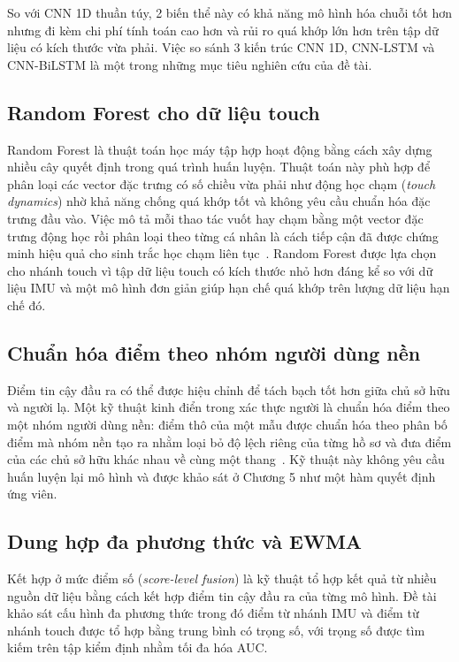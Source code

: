 \documentclass[../DoAn.tex]{subfiles}
\begin{document}
So với CNN 1D thuần túy, 2 biến thể này có khả năng mô hình hóa chuỗi tốt hơn nhưng đi kèm chi phí tính toán cao hơn và rủi ro quá khớp lớn hơn trên tập dữ liệu có kích thước vừa phải. Việc so sánh 3 kiến trúc CNN 1D, CNN-LSTM và CNN-BiLSTM là một trong những mục tiêu nghiên cứu của đề tài.

\subsection{Random Forest cho dữ liệu touch}

Random Forest là thuật toán học máy tập hợp hoạt động bằng cách xây dựng nhiều cây quyết định trong quá trình huấn luyện. Thuật toán này phù hợp để phân loại các vector đặc trưng có số chiều vừa phải như động học chạm (\textit{touch dynamics}) nhờ khả năng chống quá khớp tốt và không yêu cầu chuẩn hóa đặc trưng đầu vào. Việc mô tả mỗi thao tác vuốt hay chạm bằng một vector đặc trưng động học rồi phân loại theo từng cá nhân là cách tiếp cận đã được chứng minh hiệu quả cho sinh trắc học chạm liên tục~\cite{frank2013touchalytics}. Random Forest được lựa chọn cho nhánh touch vì tập dữ liệu touch có kích thước nhỏ hơn đáng kể so với dữ liệu IMU và một mô hình đơn giản giúp hạn chế quá khớp trên lượng dữ liệu hạn chế đó.

\subsection{Chuẩn hóa điểm theo nhóm người dùng nền}

Điểm tin cậy đầu ra có thể được hiệu chỉnh để tách bạch tốt hơn giữa chủ sở hữu và người lạ. Một kỹ thuật kinh điển trong xác thực người là chuẩn hóa điểm theo một nhóm người dùng nền: điểm thô của một mẫu được chuẩn hóa theo phân bố điểm mà nhóm nền tạo ra nhằm loại bỏ độ lệch riêng của từng hồ sơ và đưa điểm của các chủ sở hữu khác nhau về cùng một thang~\cite{auckenthaler2000score}. Kỹ thuật này không yêu cầu huấn luyện lại mô hình và được khảo sát ở Chương 5 như một hàm quyết định ứng viên.

\subsection{Dung hợp đa phương thức và EWMA}

Kết hợp ở mức điểm số (\textit{score-level fusion}) là kỹ thuật tổ hợp kết quả từ nhiều nguồn dữ liệu bằng cách kết hợp điểm tin cậy đầu ra của từng mô hình. Đề tài khảo sát cấu hình đa phương thức trong đó điểm từ nhánh IMU và điểm từ nhánh touch được tổ hợp bằng trung bình có trọng số, với trọng số được tìm kiếm trên tập kiểm định nhằm tối đa hóa AUC.
\end{document}
